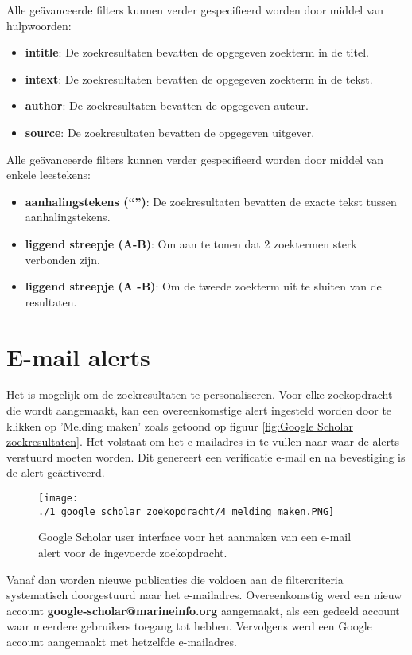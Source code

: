 Alle geävanceerde filters kunnen verder gespecifieerd worden door middel van hulpwoorden:
\begin{itemize}
    \item \textbf{intitle}: De zoekresultaten bevatten de opgegeven zoekterm in de titel.
    \item \textbf{intext}: De zoekresultaten bevatten de opgegeven zoekterm in de tekst.
    \item \textbf{author}: De zoekresultaten bevatten de opgegeven auteur.
    \item \textbf{source}: De zoekresultaten bevatten de opgegeven uitgever.
\end{itemize}

Alle geävanceerde filters kunnen verder gespecifieerd worden door middel van enkele leestekens:
\begin{itemize}
    \item \textbf{aanhalingstekens (``'')}: De zoekresultaten bevatten de exacte tekst tussen aanhalingstekens.
    \item \textbf{liggend streepje (A-B)}: Om aan te tonen dat 2 zoektermen sterk verbonden zijn.
    \item \textbf{liggend streepje (A -B)}: Om de tweede zoekterm uit te sluiten van de resultaten.
\end{itemize}

\section{E-mail alerts}
Het is mogelijk om de zoekresultaten te personaliseren. Voor elke zoekopdracht die wordt aangemaakt, kan een overeenkomstige alert ingesteld worden door te klikken op 'Melding maken' zoals getoond op figuur \ref{fig:Google Scholar zoekresultaten}.
Het volstaat om het e-mailadres in te vullen naar waar de alerts verstuurd moeten worden. Dit genereert een verificatie e-mail en na bevestiging is de alert geäctiveerd.

\begin{figure}
    \centering
    \texttt{[image: ./1\_google\_scholar\_zoekopdracht/4\_melding\_maken.PNG]}
    \caption[Google Scholar melding maken.]{\label{fig:Google Scholar melding maken}Google Scholar user interface voor het aanmaken van een e-mail alert voor de ingevoerde zoekopdracht.}
\end{figure}

Vanaf dan worden nieuwe publicaties die voldoen aan de filtercriteria systematisch doorgestuurd naar het e-mailadres.
Overeenkomstig werd een nieuw account \textbf{google-scholar@marineinfo.org} aangemaakt, als een gedeeld account waar meerdere gebruikers toegang tot hebben. Vervolgens werd een Google account aangemaakt met hetzelfde e-mailadres.
